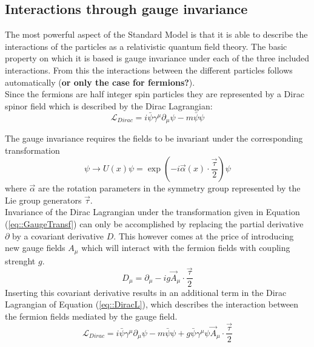 \subsection{Interactions through gauge invariance}
The most powerful aspect of the Standard Model is that it is able to describe the interactions of the particles as a relativistic quantum field theory. The basic property on which it is based is gauge invariance under each of the three included interactions. From this the interactions between the different particles follows automatically (\textbf{or only the case for fermions?}).
\\
Since the fermions are half integer spin particles they are represented by a Dirac spinor field which is described by the Dirac Lagrangian:
\begin{equation} \label{eq::DiracL}
 \mathcal{L}_{Dirac} = i \bar{\psi} \gamma^{\mu} \partial_{\mu} \psi - m \bar{\psi} \psi
\end{equation}

The gauge invariance requires the fields to be invariant under the corresponding transformation
\begin{equation} \label{eq::GaugeTransf}
 \psi \rightarrow U(x) \psi =  \exp \left( -i \vec{\alpha}(x) \cdot \frac{\vec{\tau}}{2} \right) \psi
\end{equation}
where $\vec{\alpha}$ are the rotation parameters in the symmetry group represented by the Lie group generators $\vec{\tau}$.\\

Invariance of the Dirac Lagrangian under the transformation given in Equation (\ref{eq::GaugeTransf}) can only be accomplished by replacing the partial derivative $\partial$ by a covariant derivative $D$. This however comes at the price of introducing new gauge fields $A_{\mu}$ which will interact with the fermion fields with coupling strenght $g$.
\begin{equation} \label{eq::CovDer}
 D_{\mu} = \partial_{\mu} -i g \vec{A}_{\mu} \cdot \frac{\vec{\tau}}{2}
\end{equation}
Inserting this covariant derivative results in an additional term in the Dirac Lagrangian of Equation (\ref{eq::DiracL}), which describes the interaction between the fermion fields mediated by the gauge field.
\begin{equation} \label{eq::DiracLInter}
 \mathcal{L}_{Dirac} = i \bar{\psi} \gamma^{\mu} \partial_{\mu} \psi - m \bar{\psi} \psi + g \bar{\psi} \gamma^{\mu} \psi \vec{A}_{\mu} \cdot \frac{\vec{\tau}}{2}
\end{equation}

